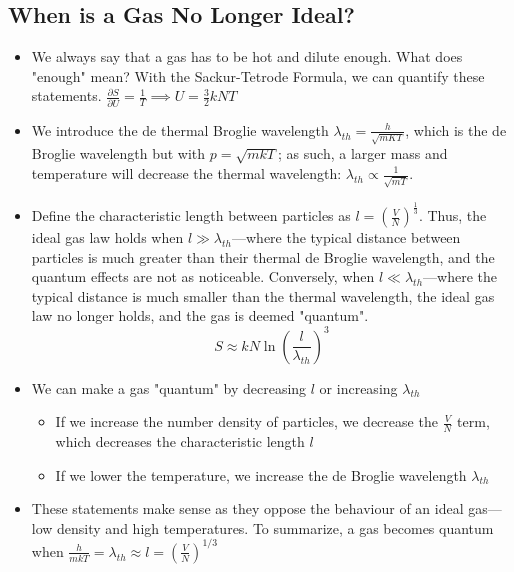 \documentclass[8pt]{article}
\begin{document}
\subsection{When is a Gas No Longer Ideal?}
\begin{itemize}
    \item We always say that a gas has to be hot and dilute enough. What does "enough" mean? With the Sackur-Tetrode Formula, we can quantify these statements. $\frac{\partial S}{\partial U} = \frac{1}{T} \implies U = \frac{3}{2}kNT$
    \item We introduce the de thermal Broglie wavelength $ \lambda_{th} = \frac{h}{\sqrt{mKT}}$, which is the de Broglie wavelength but with $p = \sqrt{mkT}$; as such, a larger mass and temperature will decrease the thermal wavelength: $\lambda_{th} \propto \frac{1}{\sqrt{mT}}$.
    \item Define the characteristic length between particles as $l = (\frac{V}{N})^{\frac{1}{3}}$. Thus, the ideal gas law holds when $l \gg \lambda_{th}$—where the typical distance between particles is much greater than their thermal de Broglie wavelength, and the quantum effects are not as noticeable. Conversely, when $l \ll \lambda_{th}$—where the typical distance is much smaller than the thermal wavelength, the ideal gas law no longer holds, and the gas is deemed "quantum". 
\begin{equation}
        S \approx kN \ln \left(\frac{l}{\lambda_{th}}\right)^3 
    \end{equation}
    \item We can make a gas "quantum" by decreasing $l$ or increasing $\lambda_{th}$ 
    \begin{itemize}
        \item If we increase the number density of particles, we decrease the $\frac{V}{N}$ term, which decreases the characteristic length $l$
        \item If we lower the temperature, we increase the de Broglie wavelength $\lambda_{th}$
    \end{itemize}
\item These statements make sense as they oppose the behaviour of an ideal gas—low density and high temperatures. To summarize, a gas becomes quantum when $\frac{h}{mkT}=\lambda_{th} \approx l = (\frac{V}{N})^{1/3}$  
\end{itemize}
\end{document}

